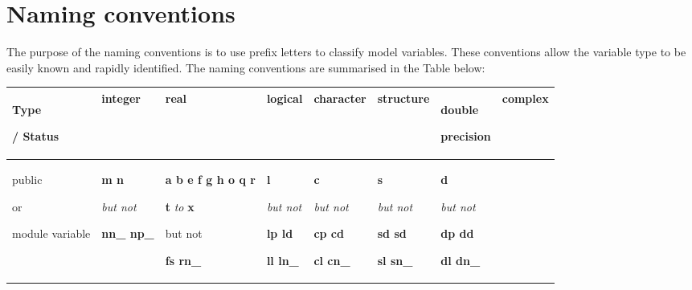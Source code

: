 \documentclass[../main/NEMO_manual]{subfiles}
\begin{document}
\newpage

\section{Naming conventions}
\label{sec:D_naming}

The purpose of the naming conventions is to use prefix letters to classify model variables.
These conventions allow the variable type to be easily known and rapidly identified.
The naming conventions are summarised in the Table below:


\begin{table}[htbp]
  \label{tab:VarName}
  \begin{center}
    \begin{tabular}{|p{45pt}|p{35pt}|p{45pt}|p{40pt}|p{40pt}|p{40pt}|p{40pt}|p{40pt}|}
      \hline
      Type \par / Status
      & integer
      & real
      & logical
      & character
      & structure
      & double \par precision
      & complex \\
      \hline
      public  \par or  \par module variable
      & \textbf{m n} \par \textit{but not} \par \textbf{nn\_ np\_}
      & \textbf{a b e f g h o q r} \par \textbf{t} \textit{to} \textbf{x} \par but not \par \textbf{fs rn\_}
      & \textbf{l} \par \textit{but not} \par \textbf{lp ld} \par \textbf{ ll ln\_}
      & \textbf{c} \par \textit{but not} \par \textbf{cp cd} \par \textbf{cl cn\_}
      & \textbf{s} \par \textit{but not} \par \textbf{sd sd} \par \textbf{sl sn\_}
      & \textbf{d} \par \textit{but not} \par \textbf{dp dd} \par \textbf{dl dn\_}

\end{tabular}
\end{center}
\end{table}
\end{document}
